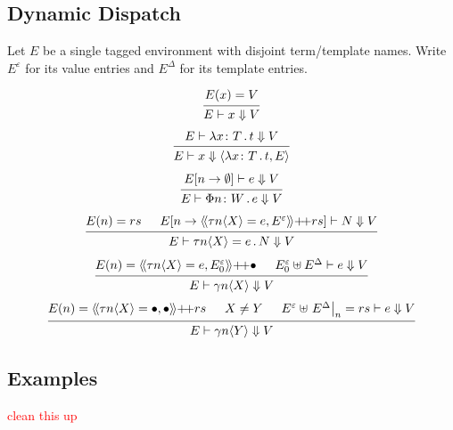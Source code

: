 \documentclass{article}
\newcommand{\todo}[1]{\textcolor{red}{#1}}
\newcommand{\la}{\langle}
\newcommand{\ra}{\rangle}
\newcommand{\lda}{\langle\!\langle}
\newcommand{\rda}{\rangle\!\rangle}
\newcommand{\ve}{\varepsilon}
\newcommand{\de}{\Delta}
\newcommand{\hole}{\bullet}
\newcommand{\st}{\,.\,}
\newcommand{\cl}{{\colon}}
\newcommand{\pp}{{+}\!{+}}
\newcommand{\da}{\Downarrow}
\newcommand{\vd}{\vdash}
\begin{document}
\subsection{Dynamic Dispatch}

Let $E$ be a single tagged environment with disjoint term/template names.
Write $E^\ve$ for its value entries and $E^\de$ for its template entries.

\begin{displaymath}
  \begin{array}{c}
    \begin{prooftree}
      \hypo{E(x) = V}
      \infer1{E \vd x \da V}
    \end{prooftree}
    \\[15pt]
    \begin{prooftree}
      \hypo{E\vd \lambda x\cl T\st t\da V}
      \infer1{E \vd x \da \la \lambda x \cl T \st t , E\ra}
    \end{prooftree}
    \\[15pt]
    \begin{prooftree}
      \hypo{E[n\to \emptyset] \vd e \da V}\
      \infer1{E \vd \Phi n \cl W \st e \da V}
    \end{prooftree}
    \\[15pt]
    \begin{prooftree}
      \hypo{E(n) = rs}
      \hypo{E[n \to \lda \tau n\la X\ra = e, E^\ve \rda \pp rs] \vd N \da V}
      \infer2{E \vd \tau n \la X \ra = e \st N \da V}
    \end{prooftree}
    \\[15pt]
    \begin{prooftree}
      \hypo{E(n) = \lda \tau n \la X \ra = e, E^\ve_0 \rda \pp \hole}
      \hypo{E^\ve_0 \uplus E^\de \vd e \da V}
      \infer2{E \vd \gamma n\la X\ra \da V}
    \end{prooftree}
    \\[15pt]
    \begin{prooftree}
      \hypo{E(n) = \lda \tau n \la X \ra = \hole, \hole \rda \pp rs}
      \hypo{X \neq Y}
      \hypo{E^\ve \uplus \left. E^\de \right|_n = rs \vd e \da V}
      \infer3{E \vd \gamma n\la Y\ra \da V}
    \end{prooftree}
  \end{array}
\end{displaymath}


\subsection{Examples}
\todo{clean this up}
\end{document}
